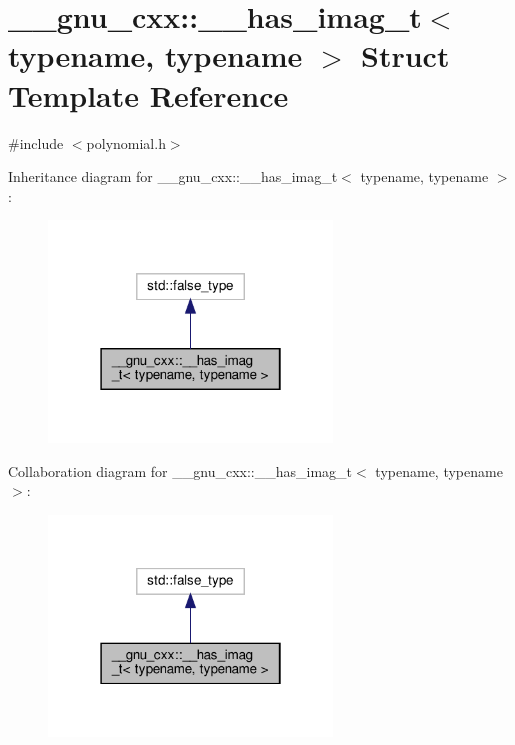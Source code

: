 \hypertarget{struct____gnu__cxx_1_1____has__imag__t}{}\section{\+\_\+\+\_\+gnu\+\_\+cxx\+:\+:\+\_\+\+\_\+has\+\_\+imag\+\_\+t$<$ typename, typename $>$ Struct Template Reference}
\label{struct____gnu__cxx_1_1____has__imag__t}


{\ttfamily \#include $<$polynomial.\+h$>$}



Inheritance diagram for \+\_\+\+\_\+gnu\+\_\+cxx\+:\+:\+\_\+\+\_\+has\+\_\+imag\+\_\+t$<$ typename, typename $>$\+:
\nopagebreak
\begin{figure}[H]
\begin{center}
\leavevmode
\includegraphics[width=214pt]{struct____gnu__cxx_1_1____has__imag__t__inherit__graph}
\end{center}
\end{figure}


Collaboration diagram for \+\_\+\+\_\+gnu\+\_\+cxx\+:\+:\+\_\+\+\_\+has\+\_\+imag\+\_\+t$<$ typename, typename $>$\+:
\nopagebreak
\begin{figure}[H]
\begin{center}
\leavevmode
\includegraphics[width=214pt]{struct____gnu__cxx_1_1____has__imag__t__coll__graph}
\end{center}
\end{figure}


